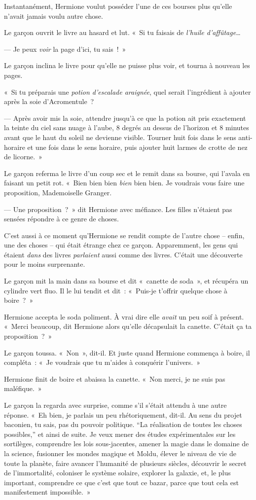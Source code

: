 Instantanément, Hermione voulut posséder l'une de ces bourses plus qu'elle n'avait jamais voulu autre chose.

Le garçon ouvrit le livre au hasard et lut.
«~Si tu faisais de \emph{l'huile d'affûtage}…

--- Je peux \emph{voir} la page d'ici, tu sais~!~»

Le garçon inclina le livre pour qu'elle ne puisse plus voir, et tourna à nouveau les pages.

«~Si tu préparais une \emph{potion d'escalade araignée}, quel serait l'ingrédient à ajouter après la soie d'Acromentule~?

--- Après avoir mis la soie, attendre jusqu'à ce que la potion ait pris exactement la teinte du ciel sans nuage à l'aube, 8 degrés au dessus de l'horizon et 8 minutes avant que le haut du soleil ne devienne visible.
Tourner huit fois dans le sens anti-horaire et une fois dans le sens horaire, puis ajouter huit larmes de crotte de nez de licorne.~»

Le garçon referma le livre d'un coup sec et le remit dans sa bourse, qui l'avala en faisant un petit rot.
«~Bien bien bien \emph{bien} bien bien. Je voudrais vous faire une proposition, Mademoiselle Granger.

--- Une proposition~?~» dit Hermione avec méfiance.
Les filles n'étaient pas sensées répondre à ce genre de choses.

C'est aussi à ce moment qu'Hermione se rendit compte de l'autre chose -- enfin, une des choses -- qui était étrange chez ce garçon.
Apparemment, les gens qui étaient \emph{dans} des livres \emph{parlaient} aussi comme des livres.
C'était une découverte pour le moins surprenante.

Le garçon mit la main dans sa bourse et dit «~canette de soda~», et récupéra un cylindre vert fluo.
Il le lui tendit et dit~: «~Puis-je t'offrir quelque chose à boire~?~»

Hermione accepta le soda poliment.
À vrai dire elle \emph{avait} un peu soif à présent.
«~Merci beaucoup, dit Hermione alors qu'elle décapsulait la canette. C'était ça ta proposition~?~»

Le garçon toussa. «~Non~», dit-il. Et juste quand Hermione commença à boire, il compléta~: «~Je voudrais que tu m'aides à conquérir l'univers.~»

Hermione finit de boire et abaissa la canette. «~Non merci, je ne suis pas maléfique.~»

Le garçon la regarda avec surprise, comme s'il s'était attendu à une autre réponse.
«~Eh bien, je parlais un peu rhétoriquement, dit-il.
Au sens du projet baconien, tu sais, pas du pouvoir politique.
“La réalisation de toutes les choses possibles,” et ainsi de suite.
Je veux mener des études expérimentales sur les sortilèges, comprendre les lois sous-jacentes, amener la magie dans le domaine de la science, fusionner les mondes magique et Moldu, élever le niveau de vie de toute la planète, faire avancer l'humanité de plusieurs siècles, découvrir le secret de l'immortalité, coloniser le système solaire, explorer la galaxie, et, le plus important, comprendre ce que c'est que tout ce bazar, parce que tout cela est manifestement impossible.~»

